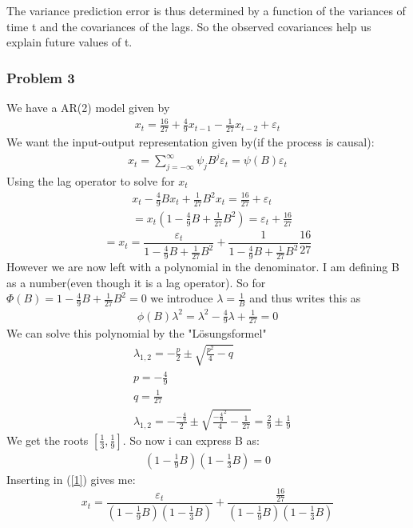 \documentclass{article}
\begin{document}
The variance prediction error is thus determined by a function of the variances of time t and the covariances of the lags. So the observed covariances help us explain future values of t. 

\subsubsection*{Problem 3}
We have a AR(2) model given by
\begin{align*}
x_t=\frac{16}{27}+\frac{4}{9}x_{t-1}-\frac{1}{27}x_{t-2}+\varepsilon_t
\end{align*}
We want the input-output representation given by(if the process is causal): 
\begin{align*}
x_t=\sum^\infty_{j=-\infty}\psi_jB^j\varepsilon_t=\psi(B)\varepsilon_t
\end{align*}
Using the lag operator to solve for $x_t$
\begin{align*}
& x_t-\frac{4}{9}Bx_t+\frac{1}{27}B^2x_t=\frac{16}{27}+\varepsilon_t\\
& =x_t(1-\frac{4}{9}B+\frac{1}{27}B^2)=\varepsilon_t+\frac{16}{27}
\end{align*}
\begin{equation}\label{1}
=x_t=\frac{\varepsilon_t}{1-\frac{4}{9}B+\frac{1}{27}B^2}+\frac{1}{1-\frac{4}{9}B+\frac{1}{27}B^2}\frac{16}{27}
\end{equation}
However we are now left with a polynomial in the denominator. I am defining B as a number(even though it is a lag operator). So for $\Phi(B)=1-\frac{4}{9}B+\frac{1}{27}B^2=0$ we introduce $\lambda=\frac{1}{B}$ and thus writes this as
\begin{align*}
\phi(B)\lambda^2=\lambda^2-\frac{4}{9}\lambda+\frac{1}{27}=0
\end{align*}
We can solve this polynomial by the "L\"osungsformel"
\begin{align*}
& \lambda_{1,2}=-\frac{p}{2}\pm \sqrt{\frac{p^2}{4}-q}\\
& p=-\frac{4}{9}\\
& q=\frac{1}{27}\\
& \lambda_{1,2}=-\frac{-\frac{4}{9}}{2}\pm \sqrt{\frac{-\frac{4}{9}^2}{4}-\frac{1}{27}}=\frac{2}{9}\pm \frac{1}{9}
\end{align*}
We get the roots $[\frac{1}{3},\frac{1}{9}]$. So now i can express B as: 
\begin{align*}
(1-\frac{1}{9}B)(1-\frac{1}{3}B)=0
\end{align*}
Inserting in (\ref{1}) gives me: 
\begin{equation*}
x_t=\frac{\varepsilon_t}{(1-\frac{1}{9}B)(1-\frac{1}{3}B)}+\frac{\frac{16}{27}}{(1-\frac{1}{9}B)(1-\frac{1}{3}B)}
\end{equation*}
\end{document}
